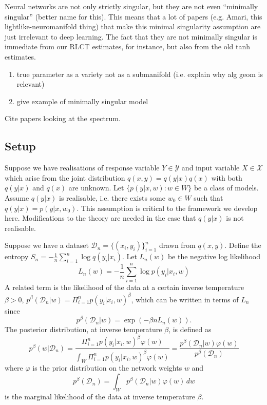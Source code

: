 \documentclass{article} %
\begin{document}
Neural networks are not only strictly singular, but they are not even ``minimally singular'' (better name for this). This means that a lot of papers (e.g. Amari, this lightlike-neuromanifold thing) that make this minimal singularity assumption are just irrelevant to deep learning. The fact that they are not minimally singular is immediate from our RLCT estimates, for instance, but also from the old tanh estimates.

\begin{enumerate}
    \item true parameter as a variety not as a submanifold (i.e. explain why alg geom is relevant)
    \item give example of minimally singular model
\end{enumerate}

Cite papers looking at the spectrum.

\subsection{Setup}
\label{sec:setup}

Suppose we have realisations of response variable $Y \in \mathcal Y$ and input variable $X \in \mathcal X$ which arise from the joint distribution $q(x,y) = q(y|x) q(x)$ with both $q(y|x)$ and $q(x)$ are unknown. Let $\{p(y|x,w): w \in W\}$ be a class of models. Assume $q(y|x)$ is realisable, i.e. there exists some $w_0 \in W$ such that $q(y|x) = p(y|x,w_0)$. This assumption is critical to the framework we develop here. Modifications to the theory are needed in the case that $q(y|x)$ is not realisable.

Suppose we have a dataset $\mathcal D_n = \{(x_i,y_i)\}_{i=1}^n$ drawn from $q(x,y)$. Define the entropy $S_n = -\frac{1}{n} \sum_{i=1}^n \log q(y_i|x_i)$.
Let $L_n(w)$ be the negative log likelihood
\[
L_n(w) = -\frac{1}{n} \sum_{i=1}^n \log p(y_i |x_i, w)
\]
A related term is the likelihood of the data at a certain inverse temperature $\beta >0$, $p^\beta(\mathcal D_n | w) = \Pi_{i=1}^n p(y_i |x_i, w)^\beta$, which can be written in terms of $L_n$ since
\begin{equation}
p^\beta(\mathcal D_n | w) = \exp(-\beta n L_n(w)).
\label{general_likelihood}
\end{equation}
The posterior distribution, at inverse temperature $\beta$, is defined as 
\begin{equation}
    p^\beta(w|\mathcal D_n) = \frac{\Pi_{i=1}^n p(y_i|x_i,w)^\beta \varphi(w)}{\int_W \Pi_{i=1}^n p(y_i|x_i,w)^\beta \varphi(w)} = \frac{p^\beta(\mathcal D_n|w) \varphi(w)}{p^\beta(\mathcal D_n)}
    \label{general_posterior}
\end{equation}
where $\varphi$ is the prior distribution on the network weights $w$ and
\begin{equation}
    p^\beta(\mathcal D_n) = \int_W p^\beta(\mathcal D_n|w) \varphi(w) \,dw
    \label{general_marginal_likelihood}
\end{equation}
is the marginal likelihood of the data at inverse temperature $\beta$. 
\end{document}
